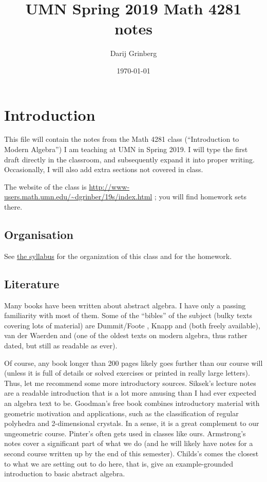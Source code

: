 \documentclass[numbers=enddot,12pt,final,onecolumn,notitlepage]{scrartcl}%
\newcounter{exer}
\numberwithin{exer}{subsection}
\theoremstyle{definition}
\begin{document}
\title{UMN Spring 2019 Math 4281 notes}
\author{Darij Grinberg}
\date{
\today
}
\maketitle
\tableofcontents

\section{Introduction}

This file will contain the notes from the Math 4281 class (``Introduction to
Modern Algebra'') I am teaching at UMN in Spring 2019. I will type the first
draft directly in the classroom, and subsequently expand it into proper
writing. Occasionally, I will also add extra sections not covered in class.

The website of the class is
\url{http://www-users.math.umn.edu/~dgrinber/19s/index.html} ; you will find
homework sets there.

\subsection{Organisation}

See \href{http://www-users.math.umn.edu/~dgrinber/19s/syll.pdf}{the syllabus}
for the organization of this class and for the homework.

\subsection{Literature}

Many books have been written about abstract algebra. I have only a passing
familiarity with most of them. Some of the ``bibles'' of the subject (bulky
texts covering lots of material) are Dummit/Foote \cite{Dummit-Foote}, Knapp
\cite{Knapp1} and \cite{Knapp2} (both freely available), van der Waerden
\cite{Waerden1} and \cite{Waerden2} (one of the oldest texts on modern
algebra, thus rather dated, but still as readable as ever).


Of course, any book longer than 200 pages likely goes further than our course
will (unless it is full of details or solved exercises or printed in really
large letters). Thus, let me recommend some more introductory sources.
Siksek's lecture notes \cite{Siksek} are a readable introduction that is a lot
more amusing than I had ever expected an algebra text to be. Goodman's free
book \cite{Goodman} combines introductory material with geometric motivation
and applications, such as the classification of regular polyhedra and
2-dimensional crystals. In a sense, it is a great complement to our
ungeometric course. Pinter's \cite{Pinter} often gets used in classes like
ours. Armstrong's notes \cite{Armstrong} cover a significant part of what we
do (and he will likely have notes for a second course written up by the end of
this semester). Childs's \cite{Childs00} comes the closest to what we are
setting out to do here, that is, give an example-grounded introduction to
basic abstract algebra.
\end{document}
